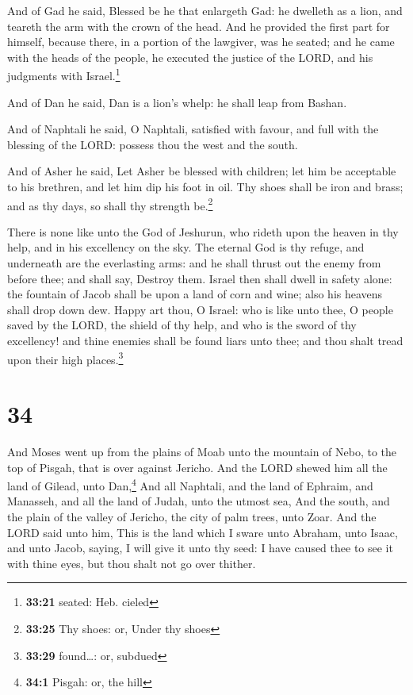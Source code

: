  And of Gad he said, Blessed be he that enlargeth Gad: he
dwelleth as a lion, and teareth the arm with the crown of the head.
 And he provided the first part for himself, because
there, in a portion of the lawgiver, was he seated; and he came with the
heads of the people, he executed the justice of the LORD, and his
judgments with Israel.\footnote{\textbf{33:21} seated: Heb. cieled}

 And of Dan he said, Dan is a lion's whelp: he shall leap
from Bashan.

 And of Naphtali he said, O Naphtali, satisfied with
favour, and full with the blessing of the LORD: possess thou the west
and the south.

 And of Asher he said, Let Asher be blessed with
children; let him be acceptable to his brethren, and let him dip his
foot in oil.  Thy shoes shall be iron and brass; and as
thy days, so shall thy strength be.\footnote{\textbf{33:25} Thy shoes:
  or, Under thy shoes}

 There is none like unto the God of Jeshurun, who rideth
upon the heaven in thy help, and in his excellency on the sky.
 The eternal God is thy refuge, and underneath are the
everlasting arms: and he shall thrust out the enemy from before thee;
and shall say, Destroy them.  Israel then shall dwell in
safety alone: the fountain of Jacob shall be upon a land of corn and
wine; also his heavens shall drop down dew.  Happy art
thou, O Israel: who is like unto thee, O people saved by the LORD, the
shield of thy help, and who is the sword of thy excellency! and thine
enemies shall be found liars unto thee; and thou shalt tread upon their
high places.\footnote{\textbf{33:29} found\ldots: or, subdued}

\hypertarget{section-33}{%
\section{34}\label{section-33}}

 And Moses went up from the plains of Moab unto the
mountain of Nebo, to the top of Pisgah, that is over against Jericho.
And the LORD shewed him all the land of Gilead, unto Dan,\footnote{\textbf{34:1}
  Pisgah: or, the hill}  And all Naphtali, and the land of
Ephraim, and Manasseh, and all the land of Judah, unto the utmost sea,
 And the south, and the plain of the valley of Jericho,
the city of palm trees, unto Zoar.  And the LORD said unto
him, This is the land which I sware unto Abraham, unto Isaac, and unto
Jacob, saying, I will give it unto thy seed: I have caused thee to see
it with thine eyes, but thou shalt not go over thither.

